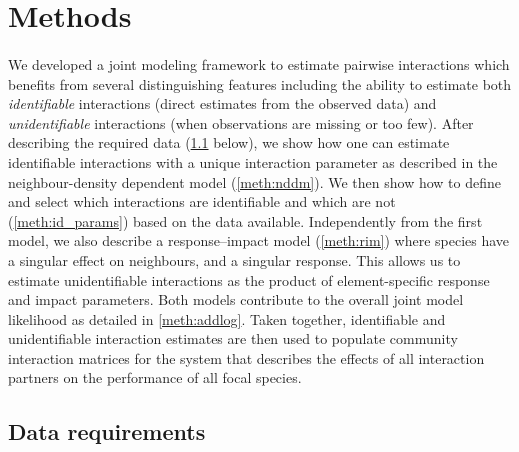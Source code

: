 \documentclass[a4,12pt]{article}
\begin{document}
\section{Methods}

\paragraph{} 
We developed a joint modeling framework to estimate pairwise interactions which benefits from several distinguishing features including the ability to estimate both \textit{identifiable} interactions (direct estimates from the observed data) and \textit{unidentifiable} interactions (when observations are missing or too few). After describing the required data (\ref{meth:data} below), we show how one can estimate identifiable interactions with a unique interaction parameter as described in the neighbour-density dependent model (\ref{meth:nddm}).
We then show how to define and select which interactions are identifiable and which are not (\ref{meth:id_params}) based on the data available. Independently from the first model, we also describe a response--impact model (\ref{meth:rim}) where species have a singular effect on neighbours, and a singular response. This allows us to estimate unidentifiable interactions as the product of element-specific response and impact parameters. Both models contribute to the overall joint model likelihood as detailed in \ref{meth:addlog}.
Taken together, identifiable and unidentifiable interaction estimates are then used to populate community interaction matrices for the system that describes the effects of all interaction partners on the performance of all focal species. 




    \subsection{Data requirements}
    \label{meth:data}
\end{document}
